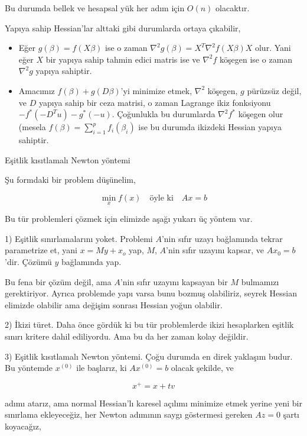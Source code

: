 \documentclass[12pt,fleqn]{article}\usepackage{../../common}
\begin{document}
Bu durumda bellek ve hesapsal yük her adım için $O(n)$ olacaktır. 

Yapıya sahip Hessian'lar alttaki gibi durumlarda ortaya çıkabilir, 

\begin{itemize}

\item Eğer $g(\beta) = f(X\beta)$ ise o zaman
  $\nabla^2 g(\beta) = X^T \nabla ^2 f(X\beta) X$ olur. Yani eğer $X$ bir
  yapıya sahip tahmin edici matris ise ve $\nabla^2 f$ köşegen ise o zaman
  $\nabla^2 g$ yapıya sahiptir.

\item Amacımız $f(\beta) + g(D\beta)$'yi minimize etmek, $\nabla^2$
  köşegen, $g$ pürüzsüz değil, ve $D$ yapıya sahip bir ceza matrisi, o
  zaman Lagrange ikiz fonksiyonu $-f^*(-D^Tu)-g^*(-u)$. Çoğunlukla bu
  durumlarda $\nabla^2f^*$ köşegen olur (mesela
  $f(\beta) = \sum _{i=1}^{p}f_i (\beta_i)$ ise bu durumda ikizdeki Hessian
  yapıya sahiptir.

\end{itemize}

Eşitlik kısıtlamalı Newton yöntemi

Şu formdaki bir problem düşünelim, 

$$
\min_x f(x) \quad \textrm{öyle ki} \quad Ax = b
$$
  
Bu tür problemleri çözmek için elimizde aşağı yukarı üç yöntem var. 

1) Eşitlik sınırlamalarını yoket. Problemi $A$'nin sıfır uzayı bağlamında
tekrar parametrize et, yani $x = My + x_o$ yap, $M$, $A$'nin sıfır uzayını
kapsar, ve $A x_0 = b$'dir. Çözümü $y$ bağlamında yap.

Bu fena bir çözüm değil, ama $A$'nin sıfır uzayını kapsayan bir $M$
bulmamızı gerektiriyor. Ayrıca problemde yapı varsa bunu bozmuş olabiliriz,
seyrek Hessian elimizde olabilir ama değişim sonrası Hessian yoğun
olabilir. 

2) İkizi türet. Daha önce gördük ki bu tür problemlerde ikizi hesaplarken
eşitlik sınırı kritere dahil ediliyordu. Ama bu da her zaman kolay
değildir. 

3) Eşitlik kısıtlamalı Newton yöntemi. Çoğu durumda en direk yaklaşım
budur. Bu yöntemde $x^{(0)}$ ile başlarız, ki $Ax^{(0)}=b$ olacak şekilde,
ve

$$
x^+ = x + tv
$$

adımı atarız, ama normal Hessian'lı karesel açılımı minimize etmek yerine
yeni bir sınırlama ekleyeceğiz, her Newton adımının saygı göstermesi
gereken $Az=0$ şartı koyacağız,  
\end{document}
